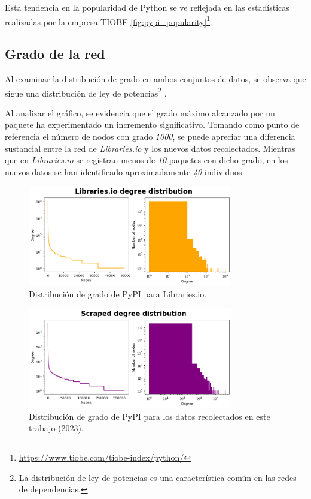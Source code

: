 Esta tendencia en la popularidad de Python se ve reflejada en las estadísticas realizadas por la
empresa TIOBE \ref{fig:pypi_popularity}\footnote{\url{https://www.tiobe.com/tiobe-index/python/}}.


\subsection{Grado de la red}

Al examinar la distribución de grado en ambos conjuntos de datos, se observa que sigue una distribución
de ley de potencias\footnote{La distribución de ley de potencias es una característica común en las redes
    de dependencias.} \cite{enwiki:1160892030}.

Al analizar el gráfico, se evidencia que el grado máximo alcanzado por un paquete ha
experimentado un incremento significativo. Tomando como punto de referencia el número de nodos con grado
\textit{1000}, se puede apreciar una diferencia sustancial entre la red de \textit{Libraries.io} y los
nuevos datos recolectados. Mientras que en \textit{Libraries.io} se registran menos de \textit{10} paquetes
con dicho grado, en los nuevos datos se han identificado aproximadamente \textit{40} individuos.

\begin{figure}[ht!]
    \begin{center}
        \includegraphics[width=0.8\textwidth]{img/pypi/librariesio_degree_distribution.png}
        \caption{Distribución de grado de PyPI para Libraries.io.}
        \label{fig:pypi_librariesio_degree_distribution}
    \end{center}
\end{figure}

\begin{figure}[ht!]
    \begin{center}
        \includegraphics[width=0.8\textwidth]{img/pypi/scraped_degree_distribution.png}
        \caption{Distribución de grado de PyPI para los datos recolectados en este trabajo (2023).}
        \label{fig:pypi_scraped_degree_distribution}
    \end{center}
\end{figure}

